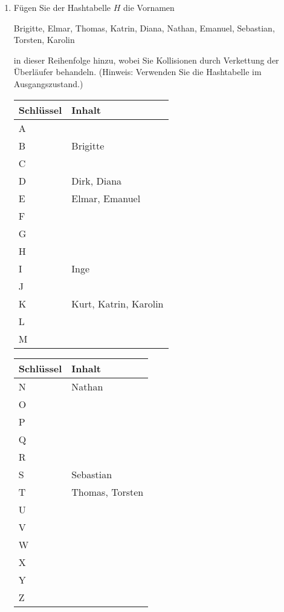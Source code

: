 \documentclass{bschlangaul-aufgabe}
\begin{document}
\begin{enumerate}

\item Fügen Sie der Hashtabelle $H$ die Vornamen

\begin{center}
Brigitte, Elmar, Thomas, Katrin, Diana, Nathan, Emanuel, Sebastian,
Torsten, Karolin
\end{center}

in dieser Reihenfolge hinzu, wobei Sie Kollisionen durch Verkettung der
Überläufer behandeln. (Hinweis: Verwenden Sie die Hashtabelle im
Ausgangszustand.)

\begin{liAntwort}
\begin{multicols}{2}
\noindent
\begin{tabularx}{\linewidth}{|l||X|}
\hline
Schlüssel & Inhalt \\\hline\hline
A &\\\hline
B & Brigitte \\\hline
C &\\\hline
D & Dirk, Diana \\\hline
E & Elmar, Emanuel \\\hline
F &\\\hline
G &\\\hline
H &\\\hline
I & Inge \\\hline
J &\\\hline
K & Kurt, Katrin, Karolin \\\hline
L &\\\hline
M &\\\hline
\end{tabularx}

\noindent
\begin{tabularx}{\linewidth}{|l||X|}
\hline
Schlüssel & Inhalt \\\hline\hline
N & Nathan \\\hline
O & \\\hline
P & \\\hline
Q & \\\hline
R & \\\hline
S & Sebastian \\\hline
T & Thomas, Torsten \\\hline
U & \\\hline
V & \\\hline
W & \\\hline
X & \\\hline
Y & \\\hline
Z & \\\hline
\end{tabularx}
\end{multicols}
\bigskip
\end{liAntwort}

\end{enumerate}
\end{document}
